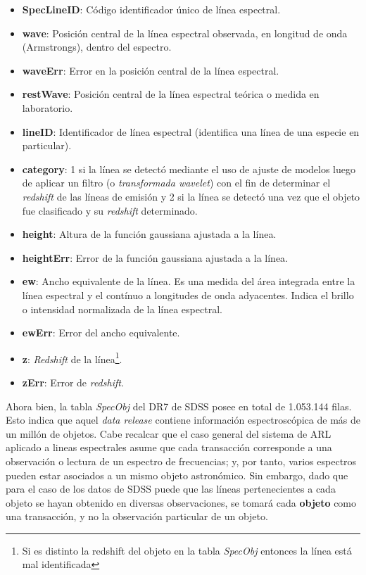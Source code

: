 \begin{itemize}
\item \textbf{SpecLineID}: Código identificador único de línea espectral.
\item \textbf{wave}: Posición central de la línea espectral observada, en longitud de onda (Armstrongs), dentro del espectro.
\item \textbf{waveErr}: Error en la posición central de la línea espectral.
\item \textbf{restWave}: Posición central de la línea espectral teórica o medida en laboratorio.
\item \textbf{lineID}: Identificador de línea espectral (identifica una línea de una especie en particular).
\item \textbf{category}: 1 si la línea se detectó mediante el uso de ajuste de modelos luego de aplicar un filtro (o \textit{transformada wavelet}) con el fin de determinar el \textit{redshift} de las líneas de emisión y 2 si la línea se detectó una vez que el objeto fue clasificado y su \textit{redshift} determinado.
\item \textbf{height}: Altura de la función gaussiana ajustada a la línea.
\item \textbf{heightErr}: Error de la función gaussiana ajustada a la línea.
\item \textbf{ew}: Ancho equivalente de la línea. Es una medida del área integrada entre la línea espectral y el contínuo a longitudes de onda adyacentes. Indica el brillo o intensidad normalizada de la línea espectral.
\item \textbf{ewErr}: Error del ancho equivalente.
\item \textbf{z}: \textit{Redshift} de la línea\footnote{Si es distinto la redshift del objeto en la tabla \textit{SpecObj} entonces la línea está mal identificada}.
\item \textbf{zErr}: Error de \textit{redshift}.
\end{itemize}

Ahora bien, la tabla \textit{SpecObj} del DR7 de SDSS posee en total de 1.053.144 filas. Esto indica que aquel \textit{data release} contiene información espectroscópica de más de un millón de objetos. Cabe recalcar que el caso general del sistema de ARL aplicado a lineas espectrales asume que cada transacción corresponde a una observación o lectura de un espectro de frecuencias; y, por tanto, varios espectros pueden estar asociados a un mismo objeto astronómico. Sin embargo, dado que para el caso de los datos de SDSS puede que las líneas pertenecientes a cada objeto se hayan obtenido en diversas observaciones, se tomará cada \textbf{objeto} como una transacción, y no la observación particular de un objeto.

